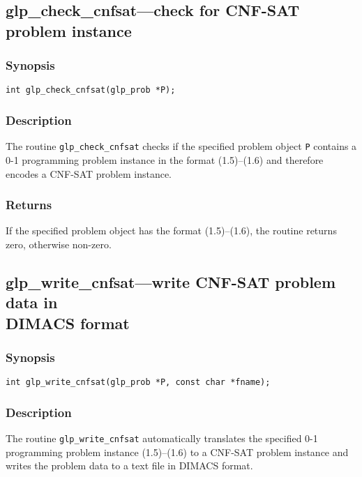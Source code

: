 \documentclass[11pt,draft]{article}
\begin{document}
\subsection{glp\_check\_cnfsat---check for CNF-SAT problem instance}

\subsubsection*{Synopsis}

\begin{verbatim}
int glp_check_cnfsat(glp_prob *P);
\end{verbatim}

\subsubsection*{Description}

The routine \verb|glp_check_cnfsat| checks if the specified problem
object \verb|P| contains a 0-1 programming problem instance in the
format (1.5)--(1.6) and therefore encodes a CNF-SAT problem instance.

\subsubsection*{Returns}

If the specified problem object has the format (1.5)--(1.6), the
routine returns zero, otherwise non-zero.

\subsection{glp\_write\_cnfsat---write CNF-SAT problem data in\\DIMACS
format}

\subsubsection*{Synopsis}

\begin{verbatim}
int glp_write_cnfsat(glp_prob *P, const char *fname);
\end{verbatim}

\subsubsection*{Description}

The routine \verb|glp_write_cnfsat| automatically translates the
specified 0-1 programming problem instance (1.5)--(1.6) to a CNF-SAT
problem instance and writes the problem data to a text file in DIMACS
format.
\end{document}
